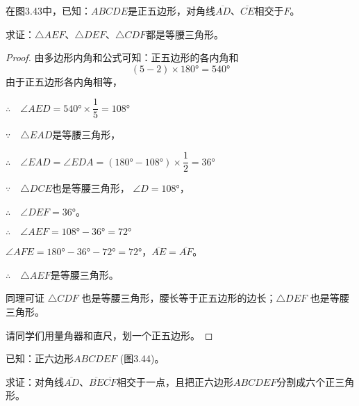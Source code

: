 \begin{example}
    在图3.43中，已知：$ABCDE$是正五边形，对角线$\overline{AD}$、$\overline{CE}$相交于$F$。

    求证：$\triangle AEF$、$\triangle DEF$、$\triangle CDF$都是等腰三角形。
\end{example}

\begin{proof}
由多边形内角和公式可知：正五边形的各内角和
\[(5-2)\times\ang{180}=\ang{540}\]
由于正五边形各内角相等，

$\therefore\quad \angle AED=\ang{540}\times\dfrac{1}{5}=\ang{108}$

$\because\quad \triangle EAD$是等腰三角形，

$\therefore\quad \angle EAD=\angle EDA=(\ang{180}-\ang{108})\times\dfrac{1}{2}=\ang{36}$

$\because\quad \triangle DCE$也是等腰三角形，
$\angle D=\ang{108}$，

$\therefore\quad \angle DEF=\ang{36}$。

$\therefore\quad \angle AEF=\ang{108}-\ang{36}=\ang{72}$

$\angle AFE=\ang{180}-\ang{36}-\ang{72}=\ang{72}$，$\overline{AE}=\overline{AF}$。

$\therefore\quad \triangle AEF$是等腰三角形。

同理可证 $\triangle CDF$ 也是等腰三角形，腰长等于正五边形的边长；$\triangle DEF$ 也是等腰三角形。

请同学们用量角器和直尺，划一个正五边形。
\end{proof}
    
\begin{example}
已知：正六边形$ABCDEF$ (图3.44)。

求证：对角线$\overline{AD}$、$\overline{BE}$$\overline{CF}$相交于一点，且把正六边形$ABCDEF$分割成六个正三角形。
\end{example}

\begin{figure}
\begin{tikzpicture}
\end{tikzpicture}
    \caption{}
\end{figure}

